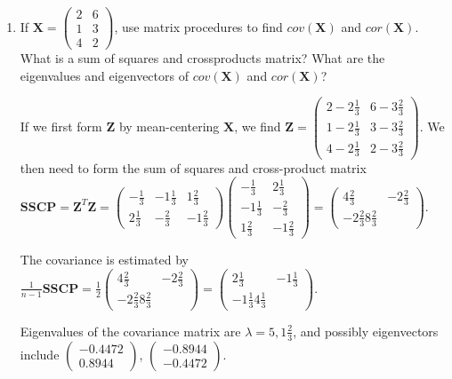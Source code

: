 \documentclass{article}
\begin{document}
\begin{enumerate}
\item If $\boldsymbol{X} = \left( \begin{array}{rr} 2 & 6\\ 1 & 3 \\ 4 & 2 \end{array} \right)$, use matrix procedures to find $cov(\boldsymbol{X})$ and $cor(\boldsymbol{X})$.   What is a sum of squares and crossproducts matrix?   What are the eigenvalues and eigenvectors of $cov(\boldsymbol{X})$ and $cor(\boldsymbol{X})$?

If we first form $\boldsymbol{Z}$ by mean-centering $\boldsymbol{X}$, we find
$\boldsymbol{Z} =  \left( \begin{array}{rr} 2 - 2\frac{1}{3} & 6 - 3\frac{2}{3}\\
 1 - 2\frac{1}{3} & 3- 3\frac{2}{3} \\ 
4 - 2\frac{1}{3} & 2- 3\frac{2}{3} \end{array} \right)$.   We then need to form the sum of squares and cross-product matrix $\boldsymbol{SSCP} = \boldsymbol{Z}^{T}\boldsymbol{Z} = \left( \begin{array}{rrr} -\frac{1}{3} & -1\frac{1}{3} & 1\frac{2}{3} \\
2\frac{1}{3} & -\frac{2}{3} & -1\frac{2}{3} \end{array} \right)
\left( \begin{array}{cc} -\frac{1}{3} & 2 \frac{1}{3} \\
-1 \frac{1}{3} & -\frac{2}{3} \\
1 \frac{2}{3} & -1 \frac{2}{3} \end{array} \right) = \left( \begin{array}{cc} 4\frac{2}{3} & -2 \frac{2}{3} \\ -2 \frac{2}{3} 8 \frac{2}{3} \end{array} \right)
$.

The covariance is estimated by $\frac{1}{n-1} \boldsymbol{SSCP} = \frac{1}{2} \left( \begin{array}{cc} 4\frac{2}{3} & -2 \frac{2}{3} \\ -2 \frac{2}{3} 8 \frac{2}{3} \end{array} \right) =  \left( \begin{array}{cc} 2\frac{1}{3} & -1 \frac{1}{3} \\ -1 \frac{1}{3} 4 \frac{1}{3} \end{array} \right)
$.

Eigenvalues of the covariance matrix are $\lambda = 5, 1\frac{2}{3}$, and possibly eigenvectors include $\left( \begin{array}{c} -0.4472 \\ 0.8944 \end{array} \right)$, $\left( \begin{array}{c} -0.8944 \\ -0.4472 \end{array} \right)$.


\end{enumerate}
\end{document}

